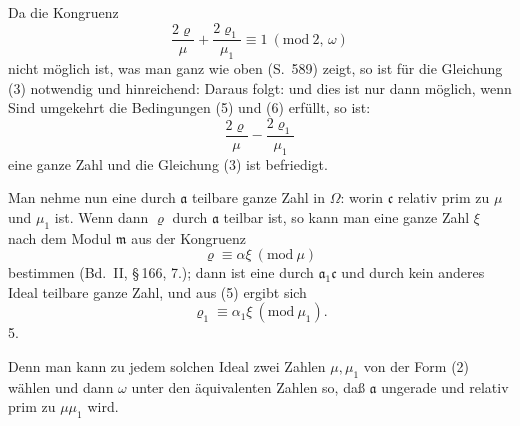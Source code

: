 Da die Kongruenz
\[
\frac{2\varrho}{\mu} + \frac{2\varrho_1}{\mu_1} \equiv 1\ (\mathrm{mod}\ 2,\,\omega)
\]
nicht m\"oglich ist, was man ganz wie oben (S.\ 589) zeigt, so ist
f\"ur die Gleichung (3) notwendig und hinreichend:
Daraus folgt:
und dies ist nur dann m\"oglich, wenn
Sind umgekehrt die Bedingungen (5) und (6) erf\"ullt, so ist:
\[
\frac{2\varrho}{\mu} - \frac{2\varrho_1}{\mu_1}
\]
eine ganze Zahl und die Gleichung (3) ist befriedigt.

Man nehme nun eine durch $\mathfrak{a}$ teilbare ganze Zahl in $\Omega$:
worin $\mathfrak{c}$ relativ prim zu $\mu$ und $\mu_1$ ist. Wenn dann $\varrho$ durch $\mathfrak{a}$
teilbar ist, so kann man eine ganze Zahl $\xi$ nach dem Modul $\mathfrak{m}$
aus der Kongruenz
\[
\varrho \equiv \alpha\xi\ (\mathrm{mod}\ \mu)
\]
bestimmen (Bd.\ II, \S\,166, 7.); dann ist
eine durch $\mathfrak{a}_1\mathfrak{c}$ und durch kein anderes Ideal teilbare ganze
Zahl, und aus (5) ergibt sich
\[
\varrho_1 \equiv \alpha_1\xi\ (\mathrm{mod}\ \mu_1).
\]
5. 


Denn man kann zu jedem solchen Ideal zwei Zahlen $\mu, \mu_1$
von der Form (2) w\"ahlen und dann $\omega$ unter den \"aquivalenten
Zahlen so, da\ss{} $\mathfrak{a}$ ungerade und relativ prim zu $\mu\mu_1$ wird.
